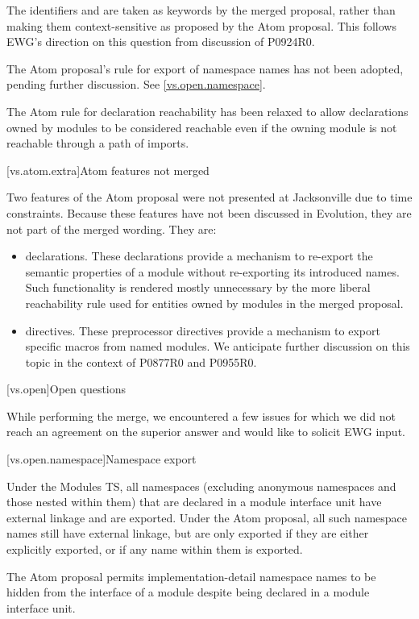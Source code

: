 \pnum
The identifiers  and  are taken as keywords
by the merged proposal,
rather than making them context-sensitive as proposed by the Atom proposal.
This follows EWG's direction on this question from discussion of P0924R0.

\pnum
The Atom proposal's rule for export of namespace names has not been adopted,
pending further discussion. See \ref{vs.open.namespace}.

\pnum
The Atom rule for declaration reachability
has been relaxed to allow declarations owned by modules
to be considered reachable even if the owning module
is not reachable through a path of imports.

[vs.atom.extra]{Atom features not merged}

\pnum
Two features of the Atom proposal were not presented at Jacksonville
due to time constraints.
Because these features have not been discussed in Evolution,
they are not part of the merged wording. They are:

\begin{itemize}
\item
{} declarations.
These declarations provide a mechanism to re-export
the semantic properties of a module
without re-exporting its introduced names.
Such functionality is rendered mostly unnecessary
by the more liberal reachability rule
used for entities owned by modules
in the merged proposal.

\item
{} directives.
These preprocessor directives provide a mechanism
to export specific macros from named modules.
We anticipate further discussion on this topic
in the context of P0877R0 and P0955R0.
\end{itemize}

[vs.open]{Open questions}

\pnum
While performing the merge, we encountered a few issues
for which we did not reach an agreement on the superior answer
and would like to solicit EWG input.

[vs.open.namespace]{Namespace export}

\pnum
Under the Modules TS,
all namespaces
(excluding anonymous namespaces and those nested within them)
that are declared in a module interface unit
have external linkage and
are exported.
Under the Atom proposal,
all such namespace names
still have external linkage,
but are only exported if they are either
explicitly exported, or
if any name within them is exported.
\begin{note}
The Atom proposal permits implementation-detail namespace names
to be hidden from the interface of a module
despite being declared in a module interface unit.
\end{note}

